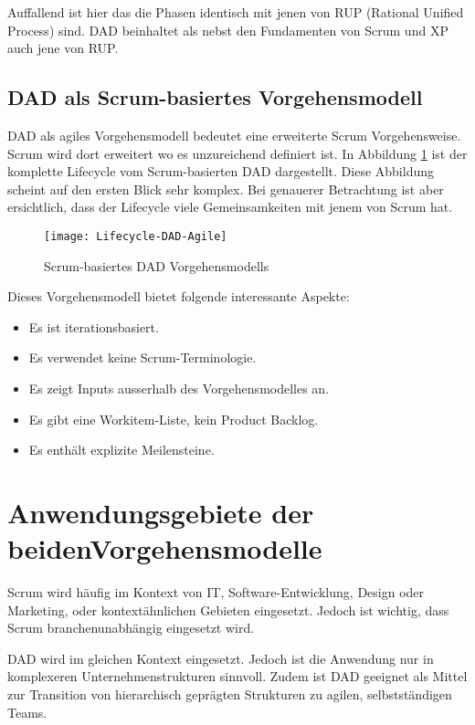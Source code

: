 Auffallend ist hier das die Phasen identisch mit jenen von RUP (Rational Unified Process) sind\cite{rup}. DAD beinhaltet als nebst den Fundamenten von Scrum und XP auch jene von RUP.


\subsection{DAD als Scrum-basiertes Vorgehensmodell}

DAD als agiles Vorgehensmodell bedeutet eine erweiterte Scrum Vorgehensweise. Scrum wird dort erweitert wo es unzureichend definiert ist. In Abbildung \ref{fig:lifecycle} ist der komplette Lifecycle vom Scrum-basierten DAD dargestellt. Diese Abbildung scheint auf den ersten Blick sehr komplex. Bei genauerer Betrachtung ist aber ersichtlich, dass der Lifecycle viele Gemeinsamkeiten mit jenem von Scrum hat.


\begin{figure}[H]
	\centering
	\texttt{[image: Lifecycle-DAD-Agile]}
	\caption{Scrum-basiertes DAD Vorgehensmodells \cite{lifecycleDAD}}
	\label{fig:lifecycle}
\end{figure}\medskip

Dieses Vorgehensmodell bietet folgende interessante Aspekte:
\begin{itemize}
	\item Es ist iterationsbasiert.
	\item Es verwendet keine Scrum-Terminologie.
	\item Es zeigt Inputs ausserhalb des Vorgehensmodelles an.
	\item Es gibt eine Workitem-Liste, kein Product Backlog.
	\item Es enthält explizite Meilensteine.
\end{itemize}

\section{Anwendungsgebiete der beiden\newline Vorgehensmodelle}

Scrum wird häufig im Kontext von IT, Software-Entwicklung, Design oder Marketing, oder kontextähnlichen Gebieten eingesetzt. Jedoch ist wichtig, dass Scrum branchenunabhängig eingesetzt wird.

DAD wird im gleichen Kontext eingesetzt. Jedoch ist die Anwendung nur in komplexeren Unternehmenstrukturen sinnvoll. Zudem ist DAD geeignet als Mittel zur Transition von hierarchisch geprägten Strukturen zu agilen, selbstständigen Teams.
 
